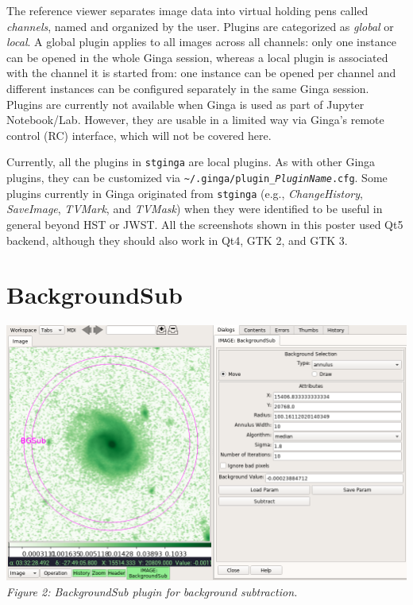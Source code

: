 \documentclass[]{article}
\begin{document}
\begin{multicols}{3}
\para
The reference viewer separates image data into virtual holding pens
called \emph{channels}, named and organized by the user.
Plugins are categorized as \emph{global} or \emph{local}.  A global
plugin applies to all images across all channels: only one instance can
be opened in the whole Ginga session, whereas a local plugin is
associated with the channel it is started from: one instance can be
opened per channel and different instances can be configured separately
in the same Ginga session. 
Plugins are currently not available when Ginga is used as part of Jupyter
Notebook/Lab. However, they are usable in a limited way via Ginga's remote
control (RC) interface, which will not be covered here.

\para
Currently, all the plugins in {\tt stginga} are local plugins.
As with other Ginga plugins, they can be customized via
{\tt \textasciitilde/.ginga/plugin\_{\em PluginName}.cfg}.
Some plugins currently in Ginga originated from {\tt stginga}
(e.g., {\em ChangeHistory}, {\em SaveImage}, {\em TVMark}, and {\em TVMask})
when they were identified to be useful in general beyond HST or JWST.
All the screenshots shown in this poster used Qt5 backend, although they should
also work in Qt4, GTK 2, and GTK 3.

\section*{BackgroundSub}

\begin{center}
\includegraphics[width=8in]{plugin_backgroundsub} \\
\vspace*{0.4em}
\label{fig:plugin_backgroundsub}
{\small\em Figure 2: BackgroundSub plugin for background subtraction.}
\end{center}


\end{multicols}
\end{document}
